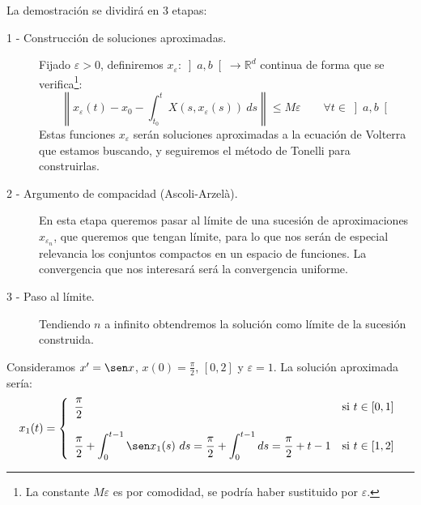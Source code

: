 \noindent
La demostración se dividirá en 3 etapas:

\begin{description}
    \item [1 - Construcción de soluciones aproximadas.] Fijado $\varepsilon>0$, definiremos \newline $x_{\varepsilon}:\left]a,b\right[\to \mathbb{R}^d$ continua de forma que se verifica\footnote{La constante $M\varepsilon$ es por comodidad, se podría haber sustituido por $\varepsilon$.}:
        \begin{equation*}
            \left\|x_{\varepsilon}(t) -x_0- \int_{t_0}^{t} X(s,x_\varepsilon(s))~ds \right\| \leq M \varepsilon \qquad \forall t\in \left]a,b\right[
        \end{equation*}
        Estas funciones $x_{\varepsilon}$ serán soluciones aproximadas a la ecuación de Volterra que estamos buscando, y seguiremos el método de Tonelli para construirlas.
    \item [2 - Argumento de compacidad (Ascoli-Arzelà).] En esta etapa queremos pasar al límite de una sucesión de aproximaciones $x_{\varepsilon_n}$, que queremos que tengan límite, para lo que nos serán de especial relevancia los conjuntos compactos en un espacio de funciones. La convergencia que nos interesará será la convergencia uniforme.
    \item [3 - Paso al límite.] Tendiendo $n$ a infinito obtendremos la solución como límite de la sucesión construida.
\end{description}

\begin{ejemplo}
    Consideramos $x'=\sen x$, $x(0) = \frac{\pi}{2}$, $[0,2]$ y $\varepsilon=1$. La solución aproximada sería:
    \begin{equation*}
        x_1(t) = \left\{\begin{array}{ll}
                \dfrac{\pi}{2} & \text{si\ } t\in [0,1] \\
                              & \\
                \displaystyle \frac{\pi}{2}+\int_{0}^{t-1} \sen x_1(s)~ds = \frac{\pi}{2}+\int_{0}^{t-1}ds = \frac{\pi}{2}+t-1 & \text{si\ } t\in [1,2]
        \end{array}\right. 
    \end{equation*}
\end{ejemplo}

